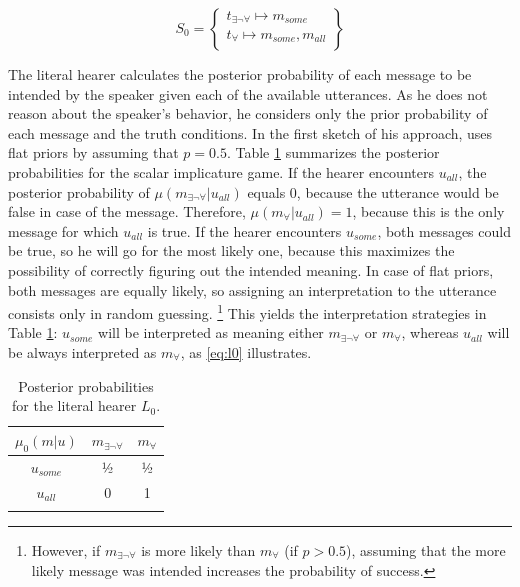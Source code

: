\begin{equation}
S_0 = \begin{Bmatrix} t_{\exists\neg\forall} \mapsto m_{some}\\
        t_{\forall} \mapsto m_{some}, m_{all}\\
       \end{Bmatrix}
\end{equation}

The literal hearer calculates the posterior probability of each message to be intended by the speaker given each of the available utterances. As he does not reason about the speaker's behavior, he considers only the prior probability of each message and the truth conditions. In the first sketch of his approach, \citet{franke2009} uses flat priors by assuming that $p = 0.5$. Table \ref{tab:gt-si-l0} summarizes the posterior probabilities for the scalar implicature game. If the hearer encounters $u_{all}$, the posterior probability of $\mu(m_{\exists\neg\forall}|u_{all})$ equals 0, because the utterance would be false in case of the message. Therefore, $\mu(m_{\forall}|u_{all}) = 1$, because this is the only message for which $u_{all}$ is true. If the hearer encounters $u_{some}$, both messages could be true, so he will go for the most likely one, because this maximizes the possibility of correctly figuring out the intended meaning. In case of flat priors, both messages are equally likely, so assigning an interpretation to the utterance consists only in random guessing.%
%
\footnote{However, if $m_{\exists\neg\forall}$ is more likely than $m_{\forall}$ (if $p > 0.5$), assuming that the more likely message was intended increases the probability of success.}\afterfn%
%
This yields the interpretation strategies in Table \ref{tab:gt-si-l0}: $u_{some}$ will be interpreted as meaning either $m_{\exists\neg\forall}$ or $m_{\forall}$, whereas $u_{all}$ will be always interpreted as $m_{\forall}$, as \ref{eq:l0} illustrates.

\begin{table}
\begin{tabular}{c c c}
 \lsptoprule
 $\mu_0(m|u)$ & $m_{\exists\neg\forall}$ & $m_{\forall}$\\
\midrule
$u_{some}$ & ½ & ½ \\
$u_{all}$ & 0 & 1\\
\lspbottomrule
\end{tabular}
\caption{Posterior probabilities for the literal hearer $L_0$.\label{tab:gt-si-l0}}
\end{table}



